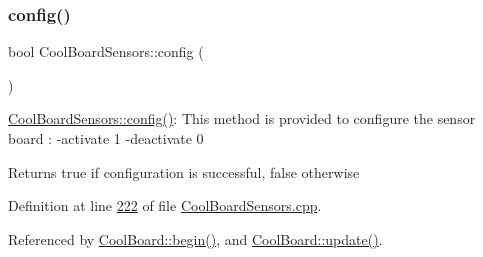 \subsubsection{\texorpdfstring{config()}{config()}}
{\footnotesize\ttfamily bool Cool\+Board\+Sensors\+::config (\begin{DoxyParamCaption}{ }\end{DoxyParamCaption})}

\hyperlink{class_cool_board_sensors_a9a218895c5423375c33c08f2c56fb23a}{Cool\+Board\+Sensors\+::config()}\+: This method is provided to configure the sensor board \+: -\/activate 1 -\/deactivate 0

\begin{DoxyReturn}{Returns}
true if configuration is successful, false otherwise 
\end{DoxyReturn}


Definition at line \hyperlink{_cool_board_sensors_8cpp_source_l00222}{222} of file \hyperlink{_cool_board_sensors_8cpp_source}{Cool\+Board\+Sensors.\+cpp}.



Referenced by \hyperlink{_cool_board_8cpp_source_l00021}{Cool\+Board\+::begin()}, and \hyperlink{_cool_board_8cpp_source_l00411}{Cool\+Board\+::update()}.


